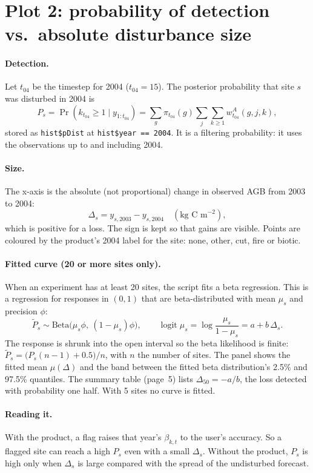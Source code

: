 \documentclass[11pt]{article}
\newcommand{\code}[1]{\texttt{#1}}
\begin{document}
\section{Plot 2: probability of detection vs.\ absolute disturbance size}
\label{sec:det}

\paragraph{Detection.} Let $t_{04}$ be the timestep for 2004 ($t_{04} = 15$). The posterior
probability that site $s$ was disturbed in 2004 is
\[
  P_s = \Pr(k_{t_{04}} \ge 1 \mid y_{1:t_{04}})
      = \sum_{g}\pi_{t_{04}}(g)\sum_{j}\sum_{k\ge1} w^A_{t_{04}}(g,j,k),
\]
stored as \code{hist\$pDist} at \code{hist\$year == 2004}. It is a filtering probability:
it uses the observations up to and including 2004.

\paragraph{Size.} The x-axis is the absolute (not proportional) change in observed AGB
from 2003 to 2004:
\[
  \Delta_s = y_{s,2003} - y_{s,2004} \quad (\text{kg C m}^{-2}),
\]
which is positive for a loss. The sign is kept so that gains are visible. Points are
coloured by the product's 2004 label for the site: none, other, cut, fire or biotic.

\paragraph{Fitted curve (20 or more sites only).} When an experiment has at least 20
sites, the script fits a beta regression. This is a regression for responses in $(0,1)$
that are beta-distributed with mean $\mu_s$ and precision $\phi$:
\[
  \tilde P_s \sim \mathrm{Beta}\big(\mu_s\phi,\ (1-\mu_s)\phi\big), \qquad
  \operatorname{logit}\mu_s = \log\frac{\mu_s}{1-\mu_s} = a + b\,\Delta_s .
\]
The response is shrunk into the open interval so the beta likelihood is finite:
$\tilde P_s = \big(P_s(n-1) + 0.5\big)/n$, with $n$ the number of sites. The panel shows
the fitted mean $\mu(\Delta)$ and the band between the fitted beta distribution's 2.5\%
and 97.5\% quantiles. The summary table (page~5) lists $\Delta_{50} = -a/b$, the loss
detected with probability one half. With 5 sites no curve is fitted.

\paragraph{Reading it.} With the product, a flag raises that year's $\beta_{k,t}$ to the
user's accuracy. So a flagged site can reach a high $P_s$ even with a small $\Delta_s$.
Without the product, $P_s$ is high only when $\Delta_s$ is large compared with the spread
of the undisturbed forecast.
\end{document}
